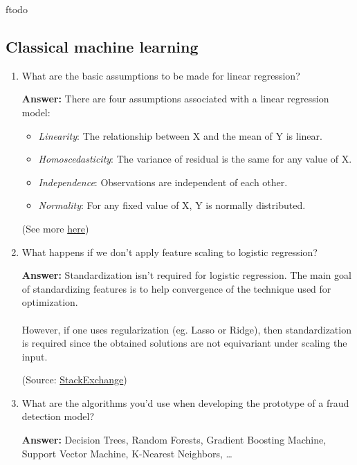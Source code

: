 ƒtodo\documentclass{article}
\newenvironment{QandA}{\begin{enumerate}[label=\arabic*.]}{\end{enumerate}}
\newenvironment{answer}{\par\normalfont \textbf{Answer:}}{}
\begin{document}
\subsection{Classical machine learning}
\begin{QandA}
    \item What are the basic assumptions to be made for linear regression?
    \begin{answer}
        There are four assumptions associated with a linear regression model:
        \begin{itemize}
            \item \textit{Linearity}: The relationship between X and the mean of Y is linear.
            \item \textit{Homoscedasticity}: The variance of residual is the same for any value of X.
            \item \textit{Independence}: Observations are independent of each other.
            \item \textit{Normality}: For any fixed value of X, Y is normally distributed.
        \end{itemize}
        (See more \href{https://sphweb.bumc.bu.edu/otlt/MPH-Modules/BS/R/R5_Correlation-Regression/R5_Correlation-Regression4.html}{here})
    \end{answer}

    \item What happens if we don’t apply feature scaling to logistic regression?
    \begin{answer}
        Standardization isn't required for logistic regression. The main goal of standardizing features is to help convergence of the technique used for optimization.\\\\
        However, if one uses regularization (eg. Lasso or Ridge), then standardization is required since the obtained solutions are not equivariant under scaling the input.

        (Source: \href{https://stats.stackexchange.com/questions/48360/is-standardization-needed-before-fitting-logistic-regression}{StackExchange})
    \end{answer}

    \item What are the algorithms you’d use when developing the prototype of a fraud detection model?
    \begin{answer}
        Decision Trees, Random Forests, Gradient Boosting Machine, Support Vector Machine, K-Nearest Neighbors, \ldots
    \end{answer}


\end{QandA}
\end{document}
